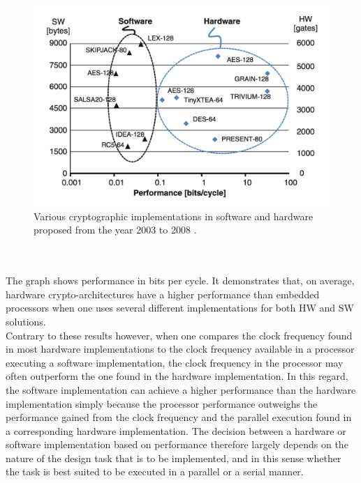 \begin{figure}[H]
    \begin{center}
        \includegraphics[scale=0.52]{Attachments/HWSWPerformance.png}
        \caption{Various cryptographic implementations in software and hardware proposed from the year 2003 to 2008 \cite{ReadingsHWSW}. }
        \label{HWSWPerformance}
    \end{center}
\end{figure}

\\\\
\noindent
The graph shows performance in bits per cycle. It demonstrates that, on average, hardware crypto-architectures
have a higher performance than embedded processors when one uses several different implementations for both HW and SW solutions. 
\\
Contrary to these results however, when one compares the clock frequency found in most hardware implementations to the clock frequency available in a processor executing a software implementation, the clock frequency in the processor may often outperform the one found in the hardware implementation. In this regard, the software implementation can achieve a higher performance than the hardware implementation simply because the processor performance outweighs the performance gained from the clock frequency and the parallel execution found in a corresponding hardware implementation. The decision between a hardware or software implementation based on performance therefore largely depends on the nature of the design task that is to be implemented, and in this sense whether the task is best suited to be executed in a parallel or a serial manner.  
\\
\noindent
